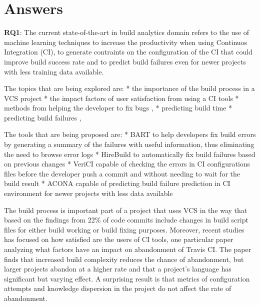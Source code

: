 \documentclass[]{book}
\begin{document}
\section{Answers}\label{answers}

\textbf{RQ1}: The current state-of-the-art in build analytics domain
refers to the use of machine learning techniques to increase the
productivity when using Continuos Integration (CI), to generate
contraints on the configuration of the CI that could improve build
success rate and to predict build failures even for newer projects with
less training data available.

The topics that are being explored are: * the importance of the build
process in a VCS project \citet{hassan2018hirebuild} * the impact
factors of user satisfaction from using a CI tools \citet{widder2018m} *
methods from helping the developer to fix bugs
\citet{hassan2018hirebuild}, \citet{vassallo2018break} * predicting
build time \citet{bisong2017built} * predicting build failures
\citet{santolucito2018statically}, \citet{ni2018acona}

The tools that are being proposed are: * BART to help developers fix
build errors by generating a summary of the failures with useful
information, thus eliminating the need to browse error logs
\citet{vassallo2018break} * HireBuild to automatically fix build
failures based on previous changes \citet{hassan2018hirebuild} * VeriCI
capable of checking the errors in CI configurations files before the
developer push a commit and without needing to wait for the build result
\citet{santolucito2018statically} * ACONA capable of predicting build
failure prediction in CI environment for newer projects with less data
available \citet{ni2018acona}

The build process is important part of a project that uses VCS in the
way that based on the findings from \citet{hassan2018hirebuild} 22\% of
code commits include changes in build script files for either build
working or build fixing purposes. Moreover, recent studies has focused
on how satisfied are the users of CI tools, one particular paper
\citet{widder2018m} analyzing what factors have an impact on abandonment
of Travis CI. The paper finds that increased build complexity reduces
the chance of abandonment, but larger projects abandon at a higher rate
and that a project's language has significant but varying effect. A
surprising result is that metrics of configuration attempts and
knowledge dispersion in the project do not affect the rate of
abandonment.
\end{document}
